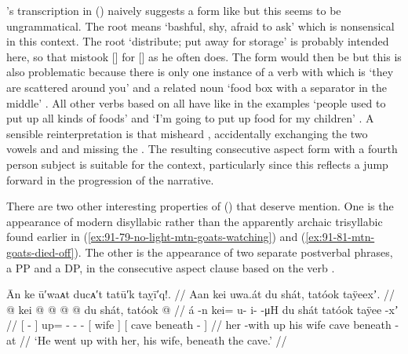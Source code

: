 \citeauthor{swanton:1909}’s transcription  in (\lastx) naively suggests a form like  but this seems to be ungrammatical.
The root  means ‘bashful, shy, afraid to ask’ which is nonsensical in this context.
The root  ‘distribute; put away for storage’ is probably intended here, so that \citeauthor{swanton:1909} mistook [] for [] as he often does.
The form would then be  but this is also problematic because there is only one instance of a verb with  which is  ‘they are scattered around you’ and a related noun  ‘food box with a separator in the middle’ \parencite[f05/5]{leer:1973}.
All other verbs based on  all have  like in the examples  ‘people used to put up all kinds of foods’ and  ‘I’m going to put up food for my children’ \parencite[164.2249–2250]{story-naish:1973}.
A sensible reinterpretation is that \citeauthor{swanton:1909} misheard , accidentally exchanging the two vowels  and  and missing the .
The resulting consecutive aspect form with a fourth person subject is suitable for the context, particularly since this reflects a jump forward in the progression of the narrative.

There are two other interesting properties of (\lastx) that deserve mention.
One is the appearance of modern disyllabic   rather than the apparently archaic trisyllabic   found earlier in (\ref{ex:91-79-no-light-mtn-goats-watching}) and (\ref{ex:91-81-mtn-goats-died-off}).
The other is the appearance of two separate postverbal phrases, a PP and a DP, in the consecutive aspect clause based on the verb .

\ex\label{ex:91-90-went-up-wife-beneath-cave}%
%
\begingl
	\glpreamble	Ān ke ū′waᴀt ducᴀ′t tatū′k taỵī′q!. //
	\glpreamble	Aan kei uwa.át du shát, tatóok taÿeexʼ. //
	\gla	{}  @ {} {} kei @  @ {} @ {} @ {}
		{} du shát, {}
		{} tatóok  @ {} {} //
	\glb	{} á -n {} kei= u- i-  -μH
		{} du shát {}
		{} tatóok taÿee -xʼ {} //
	\glc	{}[  - {}] up= - -  -
		{}[  wife {}]
		{}[ cave beneath - {}] //
	\gld	{} her -with {} up  {} {} {}
		{} his wife {}
		{} cave beneath -at {} //
	\glft	‘He went up with her, his wife, beneath the cave.’
		//
\endgl
\xe

